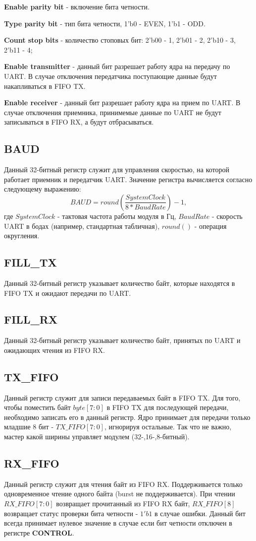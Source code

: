 \documentclass[a4paper,12pt]{article}
\begin{document}
\textbf{Enable parity bit} - включение бита четности.

\textbf{Type parity bit} - тип бита четности, 1'b0 - EVEN, 1'b1 - ODD.

\textbf{Count stop bits} - количество стоповых бит: 2'b00 - 1, 2'b01 - 2, 2'b10 - 3, 2'b11 - 4;

\textbf{Enable transmitter} - данный бит разрешает работу ядра на передачу по UART. В случае отключения передатчика поступающие данные будут накапливаться в FIFO TX.

\textbf{Enable receiver} - данный бит разрешает работу ядра на прием по UART. В случае отключения приемника, принимемые данные по UART не будут записываться в FIFO RX, а будут отбрасываться.


\subsection{BAUD}

Данный 32-битный регистр служит для управления скоростью, на которой работает приемник и передатчик UART. Значение регистра вычисляется согласно следующему выражению: $$BAUD = round\left(\frac{SystemClock}{8*BaudRate}\right)-1,$$ где $SystemClock$ - тактовая частота работы модуля в Гц, $BaudRate$ - скорость UART в бодах (например, стандартная табличная), $round()$ - операция округления.

\subsection{FILL\_TX}

Данный 32-битный регистр указывает количество байт, которые находятся в FIFO TX и ожидают передачи по UART.

\subsection{FILL\_RX}

Данный 32-битный регистр указывает количество байт, принятых по UART и ожидающих чтения из FIFO RX.

\subsection{TX\_FIFO}

Данный регистр служит для записи передаваемых байт в FIFO TX. Для того, чтобы поместить байт $byte[7:0]$ в FIFO TX для последующей передачи, необходимо записать его в данный регистр. Ядро принимает для передачи только младшие 8 бит - $TX\_FIFO[7:0]$, игнорируя остальные. Так что не важно, мастер какой ширины управляет модулем (32-,16-,8-битный).

\subsection{RX\_FIFO}

Данный регистр служит для чтения байт из FIFO RX. Поддерживается только одновременное чтение одного байта (burst не поддерживается). При чтении $RX\_FIFO[7:0]$ возвращает прочитанный из FIFO RX байт, $RX\_FIFO[8]$ возвращает статус проверки бита четности - $1'b1$ в случае ошибки. Данный бит всегда принимает нулевое значение в случае если бит четности отключен в регистре \textbf{CONTROL}.
\end{document}

